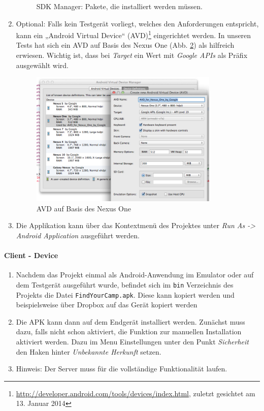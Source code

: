 \begin{enumerate}
\begin{figure}[H]
		\caption{SDK Manager: Pakete, die installiert werden müssen.}
		\label{fg:android-sdk-manager}
	\end{figure}
	\item Optional: Falls kein Testgerät vorliegt, welches den Anforderungen entspricht, kann ein „Android Virtual Device“ (AVD)\footnote{\url{http://developer.android.com/tools/devices/index.html}, zuletzt gesichtet am 13. Januar 2014} eingerichtet werden. In unseren Tests hat sich ein AVD auf Basis des Nexus One (Abb. \ref{fg:android-adv}) als hilfreich erwiesen. Wichtig ist, dass bei \textit{Target} ein Wert mit \textit{Google APIs} als Präfix ausgewählt wird.
	\begin{figure}[H]
		\centering
		\includegraphics[width=0.85\textwidth]{./images/install/android-avd.png}
		\caption{AVD auf Basis des Nexus One}
		\label{fg:android-adv}
	\end{figure}
	\item Die Applikation kann über das Kontextmenü des Projektes unter \textit{Run As -> Android Application} ausgeführt werden.
\end{enumerate}


\paragraph{Client - Device}

\begin{enumerate}
	\item Nachdem das Projekt einmal als Android-Anwendung im Emulator oder auf dem Testgerät ausgeführt wurde, befindet sich im \texttt{bin} Verzeichnis des Projekts die Datei \texttt{FindYourCamp.apk}. Diese kann kopiert werden und beispielsweise über Dropbox auf das Gerät kopiert werden
	\item Die APK kann dann auf dem Endgerät installiert werden. Zunächst muss dazu, falls nicht schon aktiviert, die Funktion zur manuellen Installation aktiviert werden. Dazu im Menu Einstellungen unter den Punkt \textit{Sicherheit} den Haken hinter \textit{Unbekannte Herkunft} setzen.
	\item Hinweis: Der Server muss für die vollständige Funktionalität laufen.
\end{enumerate}

